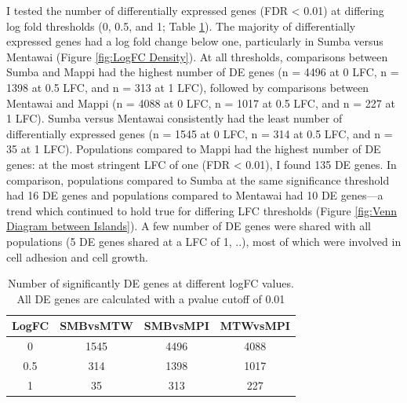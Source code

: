 \documentclass[12pt,a4paper,titlepage,twoside,openright]{book}
\begin{document}
\begin{mainmatter}
{I tested the number of differentially expressed genes (FDR < 0.01) at differing log fold thresholds (0, 0.5, and 1; Table \ref{table:LogFC Thresholds}). The majority of differentially expressed genes had a log fold change below one, particularly in Sumba versus Mentawai (Figure \ref{fig:LogFC Density}). At all thresholds, comparisons between Sumba and Mappi had the highest number of DE genes (n = 4496 at 0 LFC, n = 1398 at 0.5 LFC, and n = 313 at 1 LFC), followed by comparisons between Mentawai and Mappi (n = 4088 at 0 LFC, n = 1017 at 0.5 LFC, and n = 227 at 1 LFC). Sumba versus Mentawai consistently had the least number of differentially expressed genes (n = 1545 at 0 LFC, n = 314 at 0.5 LFC, and n = 35 at 1 LFC). Populations compared to Mappi had the highest number of DE genes: at the most stringent LFC of one (FDR < 0.01), I found 135 DE genes. In comparison, populations compared to Sumba at the same significance threshold had 16 DE genes and populations compared to Mentawai had 10 DE genes---a trend which continued to hold true for differing LFC thresholds (Figure \ref{fig:Venn Diagram between Islands}). A few number of DE genes were shared with all populations (5 DE genes shared at a LFC of 1, ..), most of which were involved in cell adhesion and cell growth. 

\begin{table}[htb!]
\caption{Number of significantly DE genes at different logFC values. All DE genes are calculated with a pvalue cutoff of 0.01}
\centering
\begin{tabular}{c c c c}
\hline\hline 
LogFC & SMBvsMTW & SMBvsMPI & MTWvsMPI \\ [0.5ex] 
\hline
0 & 1545 & 4496 & 4088 \\ 
\hline
0.5 & 314 & 1398 & 1017 \\
\hline
1 & 35 & 313 & 227 \\
\hline
\end{tabular}
\label{table:LogFC Thresholds}
\end{table}

}
\end{mainmatter}
\end{document}
